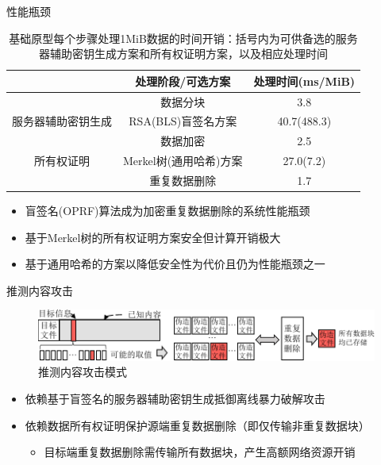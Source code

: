 \documentclass{beamer}
\begin{document}
\begin{frame}{性能瓶颈}
    \begin{table}[!htb]
        \small
        \centering
        \caption{基础原型每个步骤处理1MiB数据的时间开销：括号内为可供备选的服务器辅助密钥生成方案和所有权证明方案，以及相应处理时间}
        \label{tab:intro-bottleneck}
        \begin{tabular}{@{}ccc@{}}
            \toprule
                                        & 处理阶段/可选方案            & 处理时间(ms/MiB) \\ \midrule
                                        & 数据分块                     & 3.8              \\
            服务器辅助密钥生成          & RSA(BLS)盲签名方案 & 40.7(488.3)      \\
            \multirow{3}{*}{所有权证明} & 数据加密                     & 2.5              \\
                                        & Merkel树(通用哈希)方案     & 27.0(7.2)        \\
                                        & 重复数据删除                 & 1.7              \\ \bottomrule
        \end{tabular}
    \end{table}
    \begin{itemize}
        \item 盲签名(OPRF)算法成为加密重复数据删除的系统性能瓶颈
        \item 基于Merkel树的所有权证明方案安全但计算开销极大
        \item 基于通用哈希的方案以降低安全性为代价且仍为性能瓶颈之一
    \end{itemize}
\end{frame}

\begin{frame}{推测内容攻击}
    \begin{figure}[!htb]
        \small
        \centering
        \includegraphics[width=\textwidth]{./pic/LRI.pdf}
        \caption{推测内容攻击模式}
        \label{fig:LRI-mode}
    \end{figure}
    \vspace{-1em}
    \begin{itemize}
        \item 依赖基于盲签名的服务器辅助密钥生成抵御离线暴力破解攻击
        \item 依赖数据所有权证明保护源端重复数据删除（即仅传输非重复数据块）
              \begin{itemize}
                  \item 目标端重复数据删除需传输所有数据块，产生高额网络资源开销
              \end{itemize}
    \end{itemize}
\end{frame}
\end{document}

